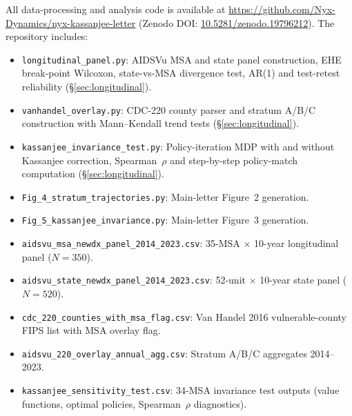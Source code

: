 \documentclass[11pt]{article}
\begin{document}
All data-processing and analysis code is available at \url{https://github.com/Nyx-Dynamics/nyx-kassanjee-letter} (Zenodo DOI: \href{https://doi.org/10.5281/zenodo.19796212}{10.5281/zenodo.19796212}). The repository includes:
\begin{itemize}
\item \texttt{longitudinal\_panel.py}: AIDSVu MSA and state panel construction, EHE break-point Wilcoxon, state-vs-MSA divergence test, AR(1) and test-retest reliability (§\ref{sec:longitudinal}).
\item \texttt{vanhandel\_overlay.py}: CDC-220 county parser and stratum A/B/C construction with Mann--Kendall trend tests (§\ref{sec:longitudinal}).
\item \texttt{kassanjee\_invariance\_test.py}: Policy-iteration MDP with and without Kassanjee correction, Spearman~$\rho$ and step-by-step policy-match computation (§\ref{sec:longitudinal}).
\item \texttt{Fig\_4\_stratum\_trajectories.py}: Main-letter Figure~2 generation.
\item \texttt{Fig\_5\_kassanjee\_invariance.py}: Main-letter Figure~3 generation.
\item \texttt{aidsvu\_msa\_newdx\_panel\_2014\_2023.csv}: 35-MSA $\times$ 10-year longitudinal panel ($N = 350$).
\item \texttt{aidsvu\_state\_newdx\_panel\_2014\_2023.csv}: 52-unit $\times$ 10-year state panel ($N = 520$).
\item \texttt{cdc\_220\_counties\_with\_msa\_flag.csv}: Van Handel 2016 vulnerable-county FIPS list with MSA overlay flag.
\item \texttt{aidsvu\_220\_overlay\_annual\_agg.csv}: Stratum A/B/C aggregates 2014--2023.
\item \texttt{kassanjee\_sensitivity\_test.csv}: 34-MSA invariance test outputs (value functions, optimal policies, Spearman~$\rho$ diagnostics).
\end{itemize}
\end{document}
